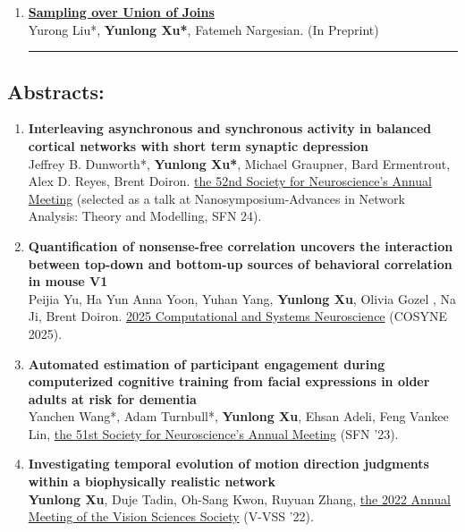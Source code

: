 \documentclass[10pt,letterpaper]{article}
\begin{document}
\begin{enumerate}
\item 
\textbf{\href{https://arxiv.org/abs/2303.00940}{Sampling over Union of Joins}}\\
Yurong Liu*, \textbf{Yunlong Xu*}, Fatemeh Nargesian.  (In Preprint)\\

\vspace{2mm}
\hrule

\end{enumerate}

\subsection{Abstracts:}

\begin{enumerate}

\item \textbf{ Interleaving asynchronous and synchronous activity in balanced cortical networks with short term synaptic depression}\\
Jeffrey B. Dunworth*, \textbf{Yunlong Xu*}, Michael Graupner, Bard Ermentrout, Alex D. Reyes, Brent Doiron. \href{https://www.sfn.org/}{the 52nd Society for Neuroscience's Annual Meeting} (selected as a talk at Nanosymposium-Advances in Network Analysis: Theory and Modelling, SFN 24).\\


\item \textbf{Quantification of nonsense-free correlation uncovers the interaction between top-down and bottom-up sources of behavioral correlation in mouse V1}\\
Peijia Yu, Ha Yun Anna Yoon, Yuhan Yang, \textbf{Yunlong Xu}, Olivia Gozel , Na Ji, Brent Doiron. \href{https://www.cosyne.org/}{2025 Computational and Systems Neuroscience} (COSYNE 2025).\\

\item \textbf{Automated estimation of participant engagement during computerized cognitive training from facial expressions in older adults at risk for dementia}\\
Yanchen Wang*, Adam Turnbull*, \textbf{Yunlong Xu}, Ehsan Adeli, Feng Vankee Lin, \href{https://www.sfn.org/}{the 51st Society for Neuroscience's Annual Meeting} (SFN '23).\\


\item \textbf{Investigating temporal evolution of motion direction judgments within a biophysically realistic network}\\
\textbf{Yunlong Xu}, Duje Tadin, Oh-Sang Kwon, Ruyuan Zhang, \href{https://www.visionsciences.org}{the 2022 Annual Meeting of the Vision Sciences Society} (V-VSS '22).\\


\end{enumerate}
\end{document}
